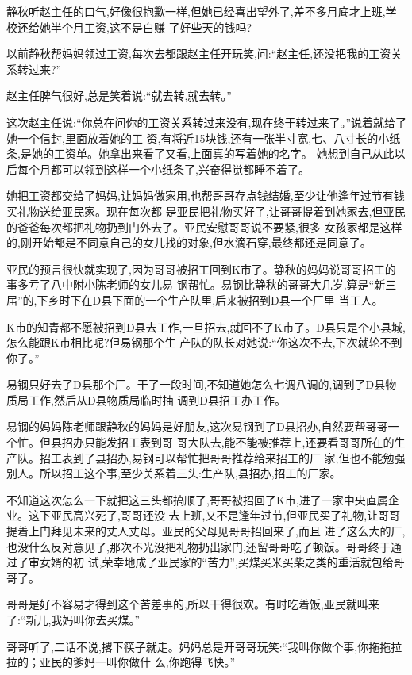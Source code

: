 ﻿\documentclass[12pt]{article}
\begin{document}
静秋听赵主任的口气,好像很抱歉一样,但她已经喜出望外了,差不多月底才上班,学校还给她半个月工资,这不是白赚
了好些天的钱吗?

以前静秋帮妈妈领过工资,每次去都跟赵主任开玩笑,问:``赵主任,还没把我的工资关系转过来?''

赵主任脾气很好,总是笑着说:``就去转,就去转。''

这次赵主任说:``你总在问你的工资关系转过来没有,现在终于转过来了。''说着就给了她一个信封,里面放着她的工
资,有将近15块钱,还有一张半寸宽,七、八寸长的小纸条,是她的工资单。她拿出来看了又看,上面真的写着她的名字。
她想到自己从此以后每个月都可以领到这样一个小纸条了,兴奋得觉都睡不着了。

她把工资都交给了妈妈,让妈妈做家用,也帮哥哥存点钱结婚,至少让他逢年过节有钱买礼物送给亚民家。现在每次都
是亚民把礼物买好了,让哥哥提着到她家去,但亚民的爸爸每次都把礼物扔到门外去了。亚民安慰哥哥说不要紧,很多
女孩家都是这样的,刚开始都是不同意自己的女儿找的对象,但水滴石穿,最终都还是同意了。

亚民的预言很快就实现了,因为哥哥被招工回到K市了。静秋的妈妈说哥哥招工的事多亏了八中附小陈老师的女儿易
钢帮忙。易钢比静秋的哥哥大几岁,算是``新三届''的,下乡时下在D县下面的一个生产队里,后来被招到D县一个厂里
当工人。

K市的知青都不愿被招到D县去工作,一旦招去,就回不了K市了。D县只是个小县城,怎么能跟K市相比呢?但易钢那个生
产队的队长对她说:``你这次不去,下次就轮不到你了。''

易钢只好去了D县那个厂。干了一段时间,不知道她怎么七调八调的,调到了D县物质局工作,然后从D县物质局临时抽
调到D县招工办工作。

易钢的妈妈陈老师跟静秋的妈妈是好朋友,这次易钢到了D县招办,自然要帮哥哥一个忙。但县招办只能发招工表到哥
哥大队去,能不能被推荐上,还要看哥哥所在的生产队。招工表到了县招办,易钢可以帮忙把哥哥推荐给来招工的厂
家,但也不能勉强别人。所以招工这个事,至少关系着三头:生产队,县招办,招工的厂家。

不知道这次怎么一下就把这三头都搞顺了,哥哥被招回了K市,进了一家中央直属企业。这下亚民高兴死了,哥哥还没
去上班,又不是逢年过节,但亚民买了礼物,让哥哥提着上门拜见未来的丈人丈母。亚民的父母见哥哥招回来了,而且
进了这么大的厂,也没什么反对意见了,那次不光没把礼物扔出家门,还留哥哥吃了顿饭。哥哥终于通过了审女婿的初
试,荣幸地成了亚民家的``苦力'',买煤买米买柴之类的重活就包给哥哥了。

哥哥是好不容易才得到这个苦差事的,所以干得很欢。有时吃着饭,亚民就叫来了:``新儿,我妈叫你去买煤。''

哥哥听了,二话不说,撂下筷子就走。妈妈总是开哥哥玩笑:``我叫你做个事,你拖拖拉拉的；亚民的爹妈一叫你做什
么,你跑得飞快。''
\end{document}
